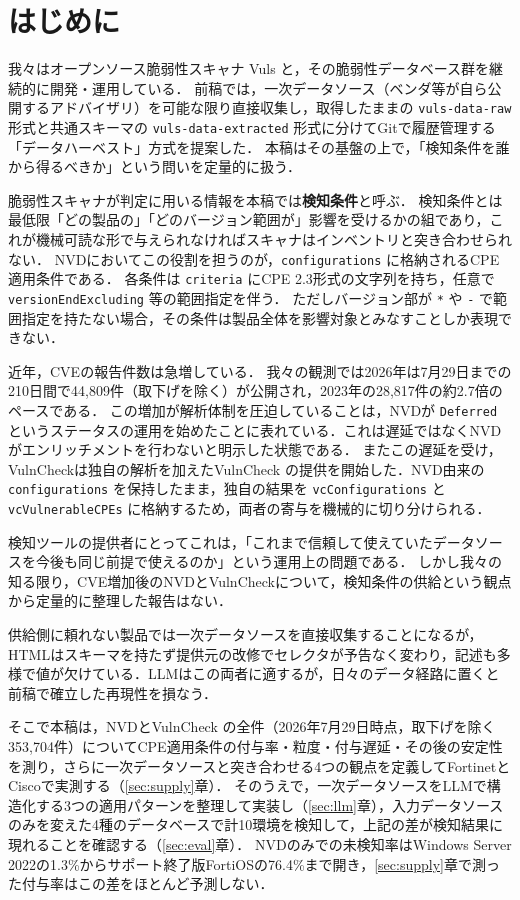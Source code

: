 \section{はじめに}
\label{sec:intro}

我々はオープンソース脆弱性スキャナ Vuls\cite{vuls} と，その脆弱性データベース群を継続的に開発・運用している．
前稿\cite{nakaoka2025}では，一次データソース（ベンダ等が自ら公開するアドバイザリ）を可能な限り直接収集し，取得したままの \texttt{vuls-data-raw} 形式と共通スキーマの \texttt{vuls-data-extracted} 形式に分けてGitで履歴管理する「データハーベスト」方式を提案した\cite{vuls-data-update,vuls-data-db}．
本稿はその基盤の上で，「検知条件を誰から得るべきか」という問いを定量的に扱う．

脆弱性スキャナが判定に用いる情報を本稿では\textbf{検知条件}と呼ぶ．
検知条件とは最低限「どの製品の」「どのバージョン範囲が」影響を受けるかの組であり，これが機械可読な形で与えられなければスキャナはインベントリと突き合わせられない．
NVD\cite{nist-nvd}においてこの役割を担うのが，\texttt{configurations} に格納されるCPE適用条件である．
各条件は \texttt{criteria} にCPE 2.3形式の文字列を持ち，任意で \texttt{versionEndExcluding} 等の範囲指定を伴う．
ただしバージョン部が \texttt{*} や \texttt{-} で範囲指定を持たない場合，その条件は製品全体を影響対象とみなすことしか表現できない．

近年，CVEの報告件数は急増している．
我々の観測では2026年は7月29日までの210日間で44,809件（取下げを除く）が公開され，2023年の28,817件の約2.7倍のペースである．
この増加が解析体制を圧迫していることは，NVDが \texttt{Deferred} というステータスの運用を始めたこと\cite{nvd-status}に表れている．これは遅延ではなくNVDがエンリッチメントを行わないと明示した状態である．
またこの遅延を受け，VulnCheckは独自の解析を加えたVulnCheck \nvdpp\cite{vulncheck-nvd2}の提供を開始した．NVD由来の \texttt{configurations} を保持したまま，独自の結果を \texttt{vcConfigurations} と \texttt{vcVulnerableCPEs} に格納するため，両者の寄与を機械的に切り分けられる．

検知ツールの提供者にとってこれは，「これまで信頼して使えていたデータソースを今後も同じ前提で使えるのか」という運用上の問題である．
しかし我々の知る限り，CVE増加後のNVDとVulnCheckについて，検知条件の供給という観点から定量的に整理した報告はない．

供給側に頼れない製品では一次データソースを直接収集することになるが，HTMLはスキーマを持たず提供元の改修でセレクタが予告なく変わり，記述も多様で値が欠けている．LLMはこの両者に適するが，日々のデータ経路に置くと前稿で確立した再現性を損なう．

そこで本稿は，NVDとVulnCheck \nvdpp の全件（2026年7月29日時点，取下げを除く353,704件）についてCPE適用条件の付与率・粒度・付与遅延・その後の安定性を測り，さらに一次データソースと突き合わせる4つの観点を定義してFortinetとCiscoで実測する（\ref{sec:supply}章）．
そのうえで，一次データソースをLLMで構造化する3つの適用パターンを整理して実装し（\ref{sec:llm}章），入力データソースのみを変えた4種のデータベースで計10環境を検知して，上記の差が検知結果に現れることを確認する（\ref{sec:eval}章）．
NVDのみでの未検知率はWindows Server 2022の1.3\%からサポート終了版FortiOSの76.4\%まで開き，\ref{sec:supply}章で測った付与率はこの差をほとんど予測しない．
